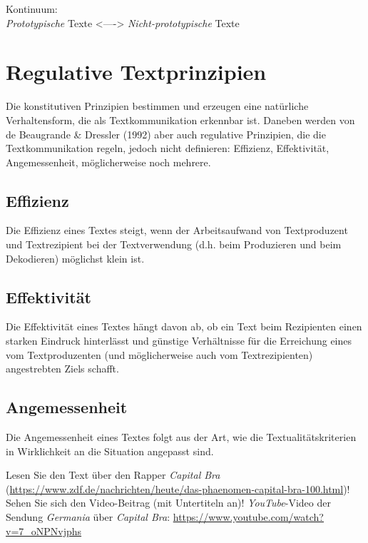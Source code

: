 \documentclass[
  letterpaper,
  DIV=11,
  numbers=noendperiod]{scrreprt}
\begin{document}
Kontinuum:\\
\emph{Prototypische} Texte \textless----\textgreater{}
\emph{Nicht-prototypische} Texte

\hypertarget{regulative-textprinzipien}{%
\section{Regulative Textprinzipien}\label{regulative-textprinzipien}}

Die konstitutiven Prinzipien bestimmen und erzeugen eine natürliche
Verhaltensform, die als Textkommunikation erkennbar ist. Daneben werden
von de Beaugrande \& Dressler (1992) aber auch regulative Prinzipien,
die die Textkommunikation regeln, jedoch nicht definieren: Effizienz,
Effektivität, Angemessenheit, möglicherweise noch mehrere.

\hypertarget{effizienz}{%
\subsection{Effizienz}\label{effizienz}}

Die Effizienz eines Textes steigt, wenn der Arbeitsaufwand von
Textproduzent und Textrezipient bei der Textverwendung (d.h. beim
Produzieren und beim Dekodieren) möglichst klein ist.

\hypertarget{effektivituxe4t}{%
\subsection{Effektivität}\label{effektivituxe4t}}

Die Effektivität eines Textes hängt davon ab, ob ein Text beim
Rezipienten einen starken Eindruck hinterlässt und günstige Verhältnisse
für die Erreichung eines vom Textproduzenten (und möglicherweise auch
vom Textrezipienten) angestrebten Ziels schafft.

\hypertarget{angemessenheit}{%
\subsection{Angemessenheit}\label{angemessenheit}}

Die Angemessenheit eines Textes folgt aus der Art, wie die
Textualitätskriterien in Wirklichkeit an die Situation angepasst sind.

Lesen Sie den Text über den Rapper \emph{Capital Bra}
(\url{https://www.zdf.de/nachrichten/heute/das-phaenomen-capital-bra-100.html})!
Sehen Sie sich den Video-Beitrag (mit Untertiteln an)!
\emph{YouTube}-Video der Sendung \emph{Germania} über \emph{Capital
Bra}: \url{https://www.youtube.com/watch?v=7_oNPNvjphs}
\end{document}
